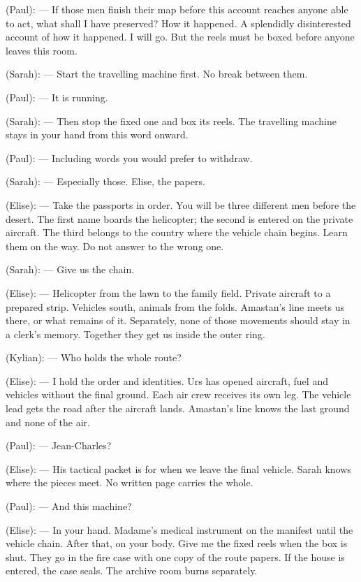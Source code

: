 \begin{room}
(Paul): --- If those men finish their map before this account reaches anyone able to act, what shall I have preserved? How it happened. A splendidly disinterested account of how it happened. I will go. But the reels must be boxed before anyone leaves this room.

(Sarah): --- Start the travelling machine first. No break between them.

(Paul): --- It is running.

(Sarah): --- Then stop the fixed one and box its reels. The travelling machine stays in your hand from this word onward.

(Paul): --- Including words you would prefer to withdraw.

(Sarah): --- Especially those. Elise, the papers.

\centerline{}

(Elise): --- Take the passports in order. You will be three different men before the desert. The first name boards the helicopter; the second is entered on the private aircraft. The third belongs to the country where the vehicle chain begins. Learn them on the way. Do not answer to the wrong one.

(Sarah): --- Give us the chain.

(Elise): --- Helicopter from the lawn to the family field. Private aircraft to a prepared strip. Vehicles south, animals from the folds. Amastan's line meets us there, or what remains of it. Separately, none of those movements should stay in a clerk's memory. Together they get us inside the outer ring.

(Kylian): --- Who holds the whole route?

(Elise): --- I hold the order and identities. Urs has opened aircraft, fuel and vehicles without the final ground. Each air crew receives its own leg. The vehicle lead gets the road after the aircraft lands. Amastan's line knows the last ground and none of the air.

(Paul): --- Jean-Charles?

(Elise): --- His tactical packet is for when we leave the final vehicle. Sarah knows where the pieces meet. No written page carries the whole.

(Paul): --- And this machine?

(Elise): --- In your hand. Madame's medical instrument on the manifest until the vehicle chain. After that, on your body. Give me the fixed reels when the box is shut. They go in the fire case with one copy of the route papers. If the house is entered, the case seals. The archive room burns separately.


\end{room}
